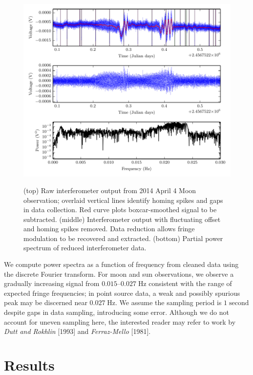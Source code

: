 \documentclass[10pt]{article}
\newcommand {\mt}{\mathrm}
\newcommand {\unit}[1]{\; \mt{#1}}
\begin{document}
\begin{figure}[!ht]
    \centering
    \includegraphics{plots/moon_cleaning.pdf} \\
    \caption{(top) Raw interferometer output from 2014 April 4 Moon observation; overlaid vertical lines identify homing spikes and gaps in data collection.  Red curve plots boxcar-smoothed signal to be subtracted. (middle) Interferometer output with fluctuating offset and homing spikes removed.  Data reduction allows fringe modulation to be recovered and extracted.  (bottom) Partial power spectrum of reduced interferometer data.}
    \label{fig:reduction}
\end{figure}

We compute power spectra as a function of frequency from cleaned data using the discrete Fourier transform.  For moon and sun observations, we observe a gradually increasing signal from $0.015$--$0.027 \unit{Hz}$ consistent with the range of expected fringe frequencies; in point source data, a weak and possibly spurious peak may be discerned near $0.027 \unit{Hz}$.  We assume the sampling period is $1 \unit{second}$ despite gaps in data sampling, introducing some error.  Although we do not account for uneven sampling here, the interested reader may refer to work by \textit{Dutt and Rokhlin} [1993] and \textit{Ferraz-Mello} [1981].

\section{Results}
\end{document}
